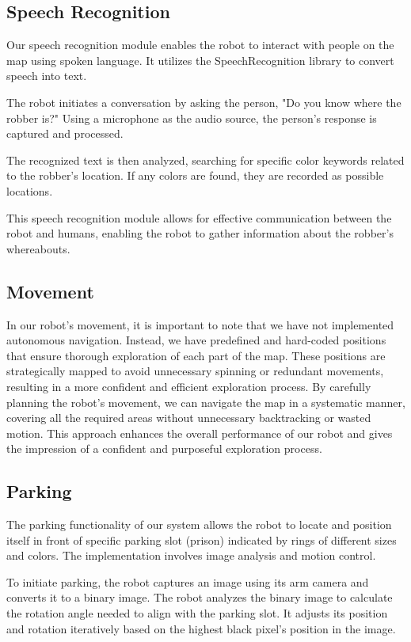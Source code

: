 \documentclass{article}
\begin{document}
\subsection{Speech Recognition}

Our speech recognition module enables the robot to interact with people on the map using spoken language. It utilizes the SpeechRecognition library to convert speech into text.

The robot initiates a conversation by asking the person, "Do you know where the robber is?" Using a microphone as the audio source, the person's response is captured and processed.

The recognized text is then analyzed, searching for specific color keywords related to the robber's location. If any colors are found, they are recorded as possible locations.

This speech recognition module allows for effective communication between the robot and humans, enabling the robot to gather information about the robber's whereabouts.

\subsection{Movement}

In our robot's movement, it is important to note that we have not implemented autonomous navigation. Instead, we have predefined and hard-coded positions that ensure thorough exploration of each part of the map. These positions are strategically mapped to avoid unnecessary spinning or redundant movements, resulting in a more confident and efficient exploration process. By carefully planning the robot's movement, we can navigate the map in a systematic manner, covering all the required areas without unnecessary backtracking or wasted motion. This approach enhances the overall performance of our robot and gives the impression of a confident and purposeful exploration process.


\subsection{Parking}

The parking functionality of our system allows the robot to locate and position itself in front of specific parking slot (prison) indicated by rings of different sizes and colors. The implementation involves image analysis and motion control.

To initiate parking, the robot captures an image using its arm camera and converts it to a binary image. The robot analyzes the binary image to calculate the rotation angle needed to align with the parking slot. It adjusts its position and rotation iteratively based on the highest black pixel's position in the image.
\end{document}
